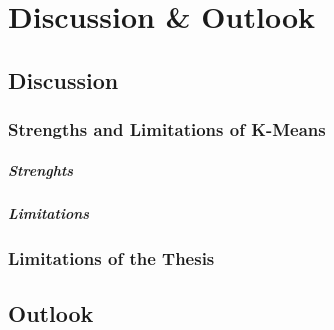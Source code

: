\chapter{Discussion \& Outlook}
\label{cha:discussion}



\section{Discussion}
\subsection{Strengths and Limitations of K-Means}
\paragraph*{Strenghts}
\paragraph*{Limitations}
\subsection{Limitations of the Thesis}


\section{Outlook}